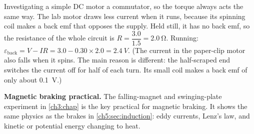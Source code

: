 \begin{experiment}{Investigating a simple DC motor}
{  a commutator, so the torque always acts the same way. The lab motor draws less current
  when it runs, because its spinning coil makes a back emf that opposes the supply. Held
  still, it has no back emf, so the resistance of the whole circuit is
  $R = \dfrac{3.0}{1.5} = \qty{2.0}{\ohm}$. Running:
  $\varepsilon_\mathrm{back} = V - IR = 3.0 - 0.30 \times 2.0 = \qty{2.4}{V}$.
  (The current in the paper-clip motor also falls when it spins. The main reason is
  different: the half-scraped end switches the current off for half of each turn. Its
  small coil makes a back emf of only about \qty{0.1}{V}.)}
\end{experiment}

\textbf{Magnetic braking practical.} The falling-magnet and swinging-plate experiment in
\cref{ch3:chap} is the key practical for magnetic braking. It shows the same physics as the
brakes in \cref{ch5:sec:induction}: eddy currents, Lenz's law, and kinetic or potential
energy changing to heat.

